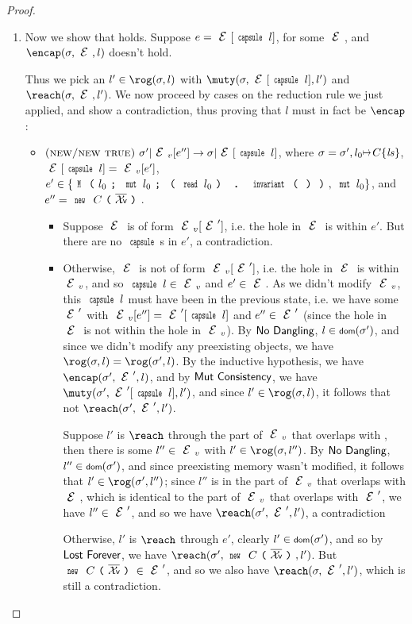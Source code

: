 \begin{proof}
\begin{enumerate}
	\item Now we show that  holds.
		Suppose $e = \E[\Kw{capsule}\,l]$, for some $\E$, and $\encap(\s,\E,l)$
		doesn't hold.
		\LSenum
		
		Thus we pick an $l'\in\rog(\s,l)$ with $\muty(\s,\E[\Kw{capsule}\,l],l')$
		and $\reach(\s,\E,l')$.		
		We now proceed by cases on the reduction rule we just applied, and
		show a contradiction, thus proving that $l$ must in fact be $\encap$:
		\begin{itemize}
			\item $\crule{new/new true}{\s'}{\EV[e'']}{\s}{\E[\Kw{capsule}\,l]}$, where
			$\s = \s',l_0\mapsto C\{\ls\}$, $\E[\Kw{capsule}\,l] = \EV[e']$, $e'\in\{\M{l_0}{\Kw{mut}\,l_0}{\invariant{l_0}},\,\Kw{mut}\,l_0\}$,
			and $e'' = \new C{\vs}$.
			\begin{itemize}
				\item Suppose $\E$ is of form $\EV[\E']$, i.e. the hole in $\E$ is within
				$e'$.
					But there are no $\Kw{capsule}$s in $e'$, a contradiction.

				\item Otherwise, $\E$ is not of form $\EV[\E']$, i.e. the hole in $\E$
				is within $\EV$, and so $\Kw{capsule}\,l\in\EV$ and $e'\in\E$.
					As we didn't modify $\EV$, this $\Kw{capsule}\,l$ must have been in the
					previous state, i.e. we have some $\E'$ with $\EV[e''] = \E'[\Kw{capsule}\,l]$
					and $e''\in\E'$ (since the hole in $\E$ is not within the hole
					in $\EV$).
					By $\textsf{No Dangling}$, $l\in\dom(\s')$, and since we didn't
					modify any preexisting objects, we have $\rog(\s,l) = \rog(\s',l)$.
					By the inductive hypothesis, we have $\encap(\s',\E',l)$, and by $\textsf{Mut Consistency}$,
					we have $\muty(\s',\E'[\Kw{capsule}\,l],l')$, and since $l'\in\rog(\s,l)$,
					it follows that not $\reach(\s',\E',l')$.
					\LSiitem
					
					Suppose $l'$ is $\reach$ through the part of $\EV$ that overlaps with \E, then there is some $l''\in\EV$
					with $l'\in\rog(\s,l'')$. By $\textsf{No Dangling}$, $l''\in\dom(\s')$,
					and since preexisting memory wasn't modified, it follows that $l'\in\rog(\s',l'')$;
					since $l''$ is in the part of $\EV$ that overlaps with $\E$, which is identical to the part of $\EV$ that overlaps with $\E'$,
					we have $l''\in\E'$, and so we have $\reach(\s',\E',l')$, a contradiction
					\LSiitem
					
					Otherwise, $l'$ is $\reach$ through $e'$, clearly $l'\in\dom(\s')$,
					and so by $\textsf{Lost Forever}$, we have $\reach(\s',\new C{\vs},l')$.
					But $\new C{\vs}\in\E'$, and so we also have $\reach(\s,\E',l')$,
					which is still a contradiction.
					\LSiitem
					

\end{itemize}
\end{itemize}
\end{enumerate}
\end{proof}
